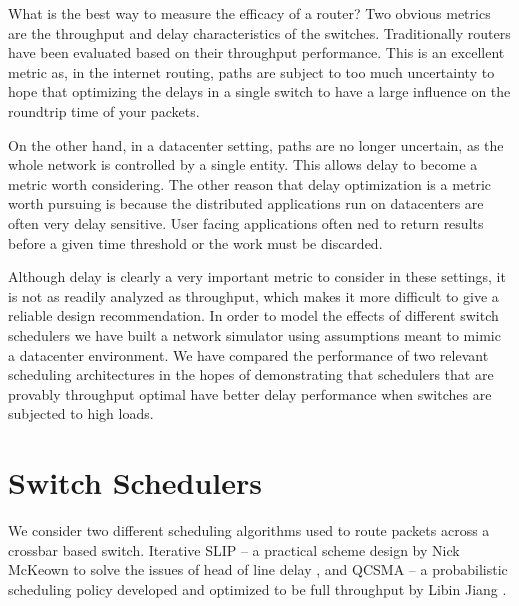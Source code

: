 \documentclass[11pt]{article}%
\begin{document}
What is the best way to measure the efficacy of a router?  Two obvious metrics are the throughput and delay characteristics of the switches.  Traditionally routers have been evaluated based on their throughput performance.  This is an excellent metric as, in the internet routing, paths are subject to too much uncertainty to hope that optimizing the delays in a single switch to have a large influence on the roundtrip time of your packets.

On the other hand, in a datacenter setting, paths are no longer uncertain, as the whole network is controlled by a single entity.  This allows delay to become a metric worth considering.  The other reason that delay optimization is a metric worth pursuing is because the distributed applications run on datacenters are often very delay sensitive.  User facing applications often ned to return results before a given time threshold or the work must be discarded.%

Although delay is clearly a very important metric to consider in these settings, it is not as readily analyzed as throughput, which makes it more difficult to give a reliable design recommendation.  In order to model the effects of different switch schedulers we have built a network simulator using assumptions meant to mimic a datacenter environment.  We have compared the performance of two relevant scheduling architectures in the hopes of demonstrating that schedulers that are provably throughput optimal have better delay performance when switches are subjected to high loads.

\section{Switch Schedulers}
We consider two different scheduling algorithms used to route packets across a crossbar based switch.  Iterative SLIP -- a practical scheme design by Nick McKeown to solve the issues of head of line delay \cite{McKeown}, and QCSMA -- a probabilistic scheduling policy developed and optimized to be full throughput by Libin Jiang \cite{Libin}.
\end{document}
